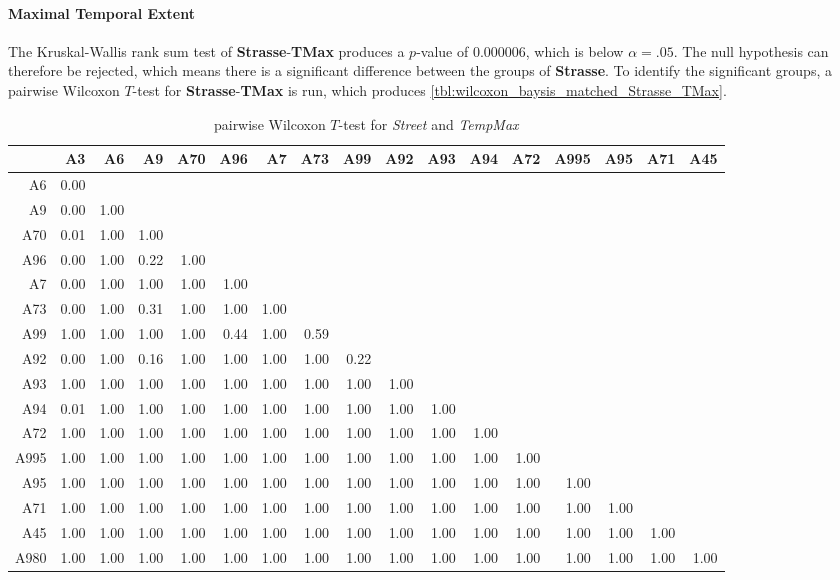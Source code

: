 \paragraph{Maximal Temporal Extent}
The Kruskal-Wallis rank sum test of \textbf{Strasse}-\textbf{TMax} produces a $p$-value of 0.000006, which is below $\alpha=.05$. The null hypothesis can therefore be rejected, which means there is a significant difference between the groups of \textbf{Strasse}. To identify the significant groups, a pairwise Wilcoxon $T$-test for \textbf{Strasse}-\textbf{TMax} is run, which produces \autoref{tbl:wilcoxon_baysis_matched_Strasse_TMax}. 
\begin{table}[ht]
	\tiny
	\setlength{\tabcolsep}{4pt}
	\centering
	\begin{tabular}{rrrrrrrrrrrrrrrrr}
		\toprule
				& A3 & A6 & A9 & A70 & A96 & A7 & A73 & A99 & A92 & A93 & A94 & A72 & A995 & A95 & A71 & A45 \\ 
		\midrule
		A6 		& 0.00 &  &  &  &  &  &  &  &  &  &  &  &  &  &  &  \\ 
		A9 		& 0.00 & 1.00 &  &  &  &  &  &  &  &  &  &  &  &  &  &  \\ 
		A70 	& 0.01 & 1.00 & 1.00 &  &  &  &  &  &  &  &  &  &  &  &  &  \\ 
		A96 	& 0.00 & 1.00 & 0.22 & 1.00 &  &  &  &  &  &  &  &  &  &  &  &  \\ 
		A7 		& 0.00 & 1.00 & 1.00 & 1.00 & 1.00 &  &  &  &  &  &  &  &  &  &  &  \\ 
		A73 	& 0.00 & 1.00 & 0.31 & 1.00 & 1.00 & 1.00 &  &  &  &  &  &  &  &  &  &  \\ 
		A99 	& 1.00 & 1.00 & 1.00 & 1.00 & 0.44 & 1.00 & 0.59 &  &  &  &  &  &  &  &  &  \\ 
		A92 	& 0.00 & 1.00 & 0.16 & 1.00 & 1.00 & 1.00 & 1.00 & 0.22 &  &  &  &  &  &  &  &  \\ 
		A93 	& 1.00 & 1.00 & 1.00 & 1.00 & 1.00 & 1.00 & 1.00 & 1.00 & 1.00 &  &  &  &  &  &  &  \\ 
		A94 	& 0.01 & 1.00 & 1.00 & 1.00 & 1.00 & 1.00 & 1.00 & 1.00 & 1.00 & 1.00 &  &  &  &  &  &  \\ 
		A72 	& 1.00 & 1.00 & 1.00 & 1.00 & 1.00 & 1.00 & 1.00 & 1.00 & 1.00 & 1.00 & 1.00 &  &  &  &  &  \\ 
		A995 	& 1.00 & 1.00 & 1.00 & 1.00 & 1.00 & 1.00 & 1.00 & 1.00 & 1.00 & 1.00 & 1.00 & 1.00 &  &  &  &  \\ 
		A95 	& 1.00 & 1.00 & 1.00 & 1.00 & 1.00 & 1.00 & 1.00 & 1.00 & 1.00 & 1.00 & 1.00 & 1.00 & 1.00 &  &  &  \\ 
		A71 	& 1.00 & 1.00 & 1.00 & 1.00 & 1.00 & 1.00 & 1.00 & 1.00 & 1.00 & 1.00 & 1.00 & 1.00 & 1.00 & 1.00 &  &  \\ 
		A45 	& 1.00 & 1.00 & 1.00 & 1.00 & 1.00 & 1.00 & 1.00 & 1.00 & 1.00 & 1.00 & 1.00 & 1.00 & 1.00 & 1.00 & 1.00 &  \\ 
		A980 	& 1.00 & 1.00 & 1.00 & 1.00 & 1.00 & 1.00 & 1.00 & 1.00 & 1.00 & 1.00 & 1.00 & 1.00 & 1.00 & 1.00 & 1.00 & 1.00 \\ 
		\bottomrule
	\end{tabular}
	\caption{pairwise Wilcoxon $T$-test for \textit{Street} and \textit{TempMax}}
	\label{tbl:wilcoxon_baysis_matched_Strasse_TMax}
\end{table}
